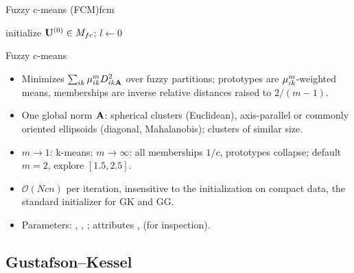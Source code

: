 \begin{algobox}{Fuzzy c-means (FCM)}{fcm}
\begin{algorithm}[H]
initialize $\mathbf{U}^{(0)}\in M_{fc}$; $l\leftarrow0$\;
\end{algorithm}
\end{algobox}
\begin{summarybox}{Fuzzy c-means}
\begin{itemize}
  \item Minimizes $\sum_{ik}\mu_{ik}^m D^2_{ik\mathbf{A}}$ over fuzzy partitions; prototypes are $\mu_{ik}^m$-weighted means, memberships are inverse relative distances raised to $2/(m-1)$.
  \item One global norm $\mathbf{A}$: spherical clusters (Euclidean), axis-parallel or commonly oriented ellipsoids (diagonal, Mahalanobis); clusters of similar size.
  \item $m\to1$: k-means; $m\to\infty$: all memberships $1/c$, prototypes collapse; default $m=2$, explore $[1.5,2.5]$.
  \item $\mathcal{O}(Ncn)$ per iteration, insensitive to the initialization on compact data, the standard initializer for GK and GG.
  \item Parameters: , , ; attributes ,  (for inspection).
\end{itemize}
\end{summarybox}

\subsection{Gustafson--Kessel}\label{sec:part:gk}

